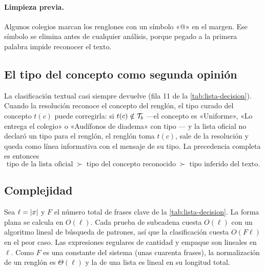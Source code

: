 \paragraph{Limpieza previa.} Algunos colegios marcan los renglones con un
símbolo «@» en el margen. Ese símbolo se elimina antes de cualquier análisis,
porque pegado a la primera palabra impide reconocer el texto.

\subsection{El tipo del concepto como segunda opinión}

La clasificación textual casi siempre devuelve  (fila 11 de la
\cref{tab:lista-decision}). Cuando la resolución reconoce el concepto del
renglón, el tipo curado del concepto $t(c)$ puede corregirla: si
$t(c)\notin\mathcal{T}_b$ ---el concepto es «Uniforme», «Lo entrega el colegio» o
«Audífonos de diadema» con tipo --- y la lista oficial no declaró un
tipo para el renglón, el renglón toma $t(c)$, sale de la resolución y queda
como línea informativa con el mensaje de su tipo. La precedencia completa es
entonces
\[
  \text{tipo de la lista oficial} \;\succ\; \text{tipo del concepto reconocido}
  \;\succ\; \text{tipo inferido del texto}.
\]

\subsection{Complejidad}

Sea $\ell=\left\lvert x \right\rvert$ y $F$ el número total de frases clave de la
\cref{tab:lista-decision}. La forma plana se calcula en $O(\ell)$. Cada prueba
de subcadena cuesta $O(\ell)$ con un algoritmo lineal de búsqueda de patrones,
así que la clasificación cuesta $O(F\ell)$ en el peor caso. Las expresiones
regulares de cantidad y empaque son lineales en $\ell$. Como $F$ es una
constante del sistema (unas cuarenta frases), la normalización de un renglón
es $\Theta(\ell)$ y la de una lista es lineal en su longitud total.

